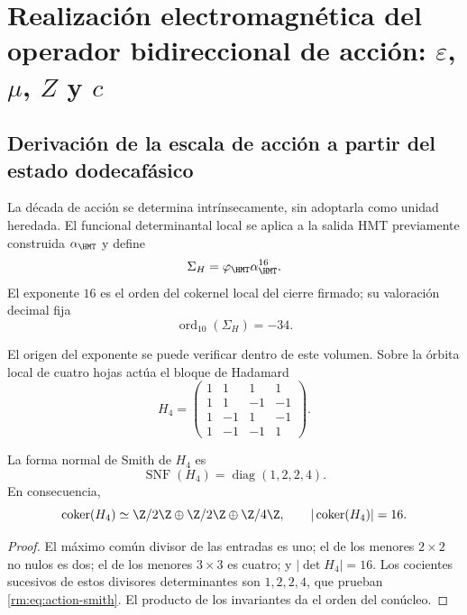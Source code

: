 \section{Realizaci\'on electromagn\'etica del operador bidireccional de acci\'on: \(\varepsilon\), \(\mu\), \(Z\) y \(c\)}
\label{rm:ch:vacuum}

\subsection{Derivaci\'on de la escala de acci\'on a partir del estado dodecaf\'asico}

La d\'ecada de acci\'on se determina intr\'insecamente, sin adoptarla como
unidad heredada. El funcional determinantal local se aplica a la salida HMT
previamente construida \(\alpha_{\HMT}\) y define
\begin{equation}
\Sigma_H=\varphi_{\HMT}\alpha_{\HMT}^{16}.
\label{rm:eq:action-determinantal-reader}
\end{equation}
El exponente \(16\) es el orden del cokernel local del cierre firmado; su valoraci\'on decimal fija
\begin{equation}
\operatorname{ord}_{10}(\Sigma_H)=-34.
\label{rm:eq:action-decade}
\end{equation}

El origen del exponente se puede verificar dentro de este volumen. Sobre la
\'orbita local de cuatro hojas act\'ua el bloque de Hadamard
\begin{equation}
H_4=
\begin{pmatrix}
1&1&1&1\\
1&1&-1&-1\\
1&-1&1&-1\\
1&-1&-1&1
\end{pmatrix}.
\label{rm:eq:action-hadamard}
\end{equation}

\begin{lemma}
La forma normal de Smith de \(H_4\) es
\begin{equation}
\operatorname{SNF}(H_4)=\operatorname{diag}(1,2,2,4).
\label{rm:eq:action-smith}
\end{equation}
En consecuencia,
\[
\operatorname{coker}(H_4)\simeq
\Z/2\Z\oplus\Z/2\Z\oplus\Z/4\Z,
\qquad
|\operatorname{coker}(H_4)|=16.
\]
\end{lemma}

\begin{proof}
El m\'aximo com\'un divisor de las entradas es uno; el de los menores
\(2\times2\) no nulos es dos; el de los menores \(3\times3\) es cuatro; y
\(|\det H_4|=16\). Los cocientes sucesivos de estos divisores determinantes
son \(1,2,2,4\), que prueban \cref{rm:eq:action-smith}. El producto de los
invariantes da el orden del con\'ucleo.
\end{proof}

